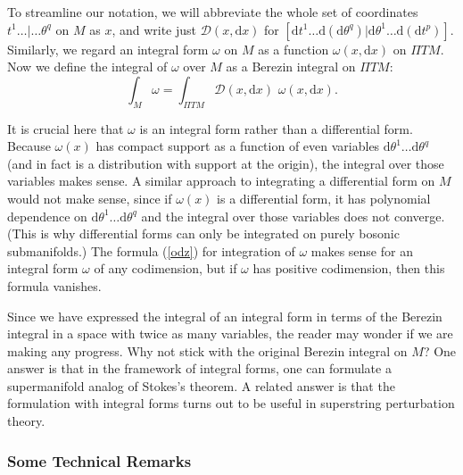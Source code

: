 \documentclass[11pt,a4paper]{article}
\def\D{{\mathcal D}}
\def\d{{\mathrm d}}
\def\D{{\mathcal D}}
\def\Pi{\varPi}
\begin{document}
To streamline our notation, we will abbreviate the whole set of coordinates $t^1\dots|\dots\theta^q$ on $M$ as $x$, and write
just $\D (x,\d x)$ for  $[\d t^1\dots \d(\d\theta^q)|\d\theta^1\dots \d(\d t^p)] $.  Similarly, we regard an integral form $\omega$ on $M$ as a function $\omega(x,\d x)$
on ${\Pi} TM$.  Now we define the integral of $\omega$ over $M$ as a Berezin integral on ${\Pi} TM$:
\begin{equation}\label{odz} \int_M\omega=\int_{{\Pi} TM}\D (x,\d x)\,\,\omega(x, \d x).\end{equation}

It is crucial here that $\omega$ is an integral form rather than a differential form.
Because $\omega(x)$ has compact support as a function of even variables $\d\theta^1\dots\d\theta^q$ (and in fact is
a distribution with support at the origin),
the integral over those variables makes sense.  A similar approach to integrating a differential form on $M$ would not make
sense, since if $\omega(x)$ is a differential form, it has polynomial dependence on $\d\theta^1\dots\d\theta^q$ and the integral over
those variables does not converge.   (This is why differential forms can only be integrated on purely bosonic submanifolds.)
The formula (\ref{odz}) for integration of $\omega$ makes sense for an integral  form $\omega$ of any
codimension, but if $\omega$ has positive codimension, then this formula vanishes.

Since we have expressed the integral of an integral form in terms of the Berezin integral in a space with twice as many variables, 
the reader may wonder if we are making
any progress.  Why not stick with the original Berezin integral on $M$?  One answer is that in the framework of integral forms, one can
 formulate a supermanifold analog of Stokes's theorem.  A related answer is that the formulation with integral forms turns out
to be useful in superstring perturbation theory.

\subsubsection{Some Technical Remarks}\label{technical}
\end{document}
